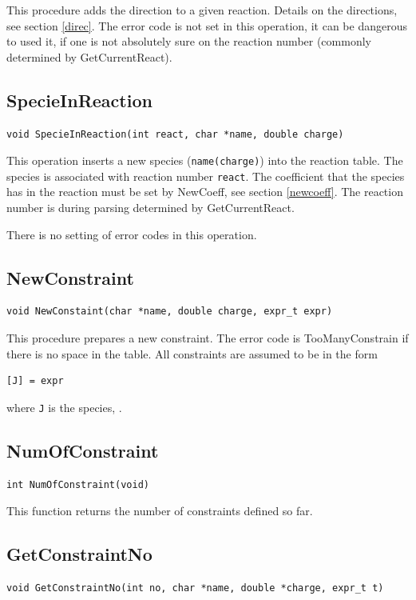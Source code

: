 This procedure adds the direction to a given reaction. Details on the 
directions, see section \ref{direc}. The error code is not set in 
this operation, \ie it can be
dangerous to used it, if one is not absolutely sure on the reaction
number (commonly determined by GetCurrentReact).

\subsection{SpecieInReaction}
\begin{verbatim}
void SpecieInReaction(int react, char *name, double charge)
\end{verbatim}

This operation inserts a new species ({\tt name(charge)}) into the 
reaction table. The species is associated with reaction number 
{\tt react}. The coefficient that the species has in the reaction 
must be set by NewCoeff, see section \ref{newcoeff}. The reaction
number is during parsing determined by GetCurrentReact.

There is no setting of error codes in this operation.  

\subsection{NewConstraint}
\begin{verbatim}
void NewConstaint(char *name, double charge, expr_t expr)
\end{verbatim}

This procedure prepares a new constraint. The error code is 
TooManyConstrain if there is no space in the table. All constraints
are assumed to be in the form

\begin{verbatim}
[J] = expr  
\end{verbatim}
where {\tt J} is the species, .

\subsection{NumOfConstraint}
\begin{verbatim}
int NumOfConstraint(void)
\end{verbatim}

This function returns the number of constraints defined so far.

\subsection{GetConstraintNo}
\begin{verbatim}
void GetConstraintNo(int no, char *name, double *charge, expr_t t)
\end{verbatim}


